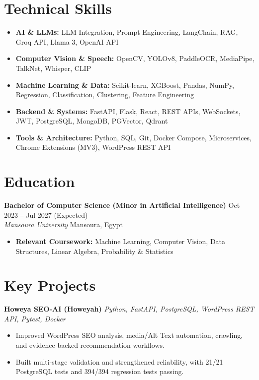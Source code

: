 \documentclass[a4paper,10pt]{article}
\begin{document}
\section{Technical Skills}
\begin{itemize}[noitemsep, topsep=0pt, leftmargin=*]
    \item \textbf{AI \& LLMs:} LLM Integration, Prompt Engineering, LangChain, RAG, Groq API, Llama 3, OpenAI API
    \item \textbf{Computer Vision \& Speech:} OpenCV, YOLOv8, PaddleOCR, MediaPipe, TalkNet, Whisper, CLIP
    \item \textbf{Machine Learning \& Data:} Scikit-learn, XGBoost, Pandas, NumPy, Regression, Classification, Clustering, Feature Engineering
    \item \textbf{Backend \& Systems:} FastAPI, Flask, React, REST APIs, WebSockets, JWT, PostgreSQL, MongoDB, PGVector, Qdrant
    \item \textbf{Tools \& Architecture:} Python, SQL, Git, Docker Compose, Microservices, Chrome Extensions (MV3), WordPress REST API
\end{itemize}

\section{Education}
\textbf{Bachelor of Computer Science (Minor in Artificial Intelligence)} \hfill Oct 2023 -- Jul 2027 (Expected) \\
\textit{Mansoura University} \hfill Mansoura, Egypt
\begin{itemize}[noitemsep, topsep=0pt, leftmargin=*]
    \item \textbf{Relevant Coursework:} Machine Learning, Computer Vision, Data Structures, Linear Algebra, Probability \& Statistics
\end{itemize}

\section{Key Projects}

\textbf{Howeya SEO-AI (Howeyah)} \hfill \textit{Python, FastAPI, PostgreSQL, WordPress REST API, Pytest, Docker}
\begin{itemize}[noitemsep, topsep=0pt, leftmargin=*]
    \item Improved WordPress SEO analysis, media/Alt Text automation, crawling, and evidence-backed recommendation workflows.
    \item Built multi-stage validation and strengthened reliability, with 21/21 PostgreSQL tests and 394/394 regression tests passing.
\end{itemize}
\end{document}
